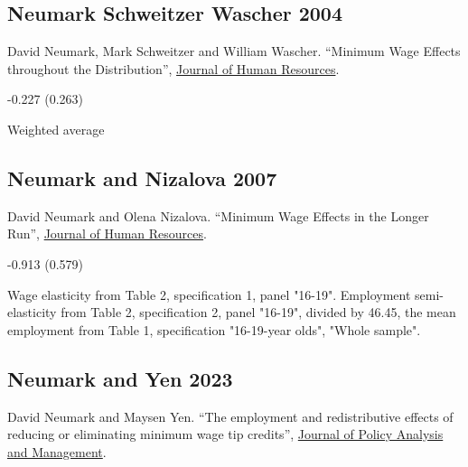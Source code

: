 \subsection*{Neumark Schweitzer Wascher 2004}
\vspace{-0.7em}

\noindent David Neumark, Mark Schweitzer and William Wascher. ``Minimum Wage Effects throughout the Distribution'', \href{https://doi.org/10.3368/jhr.XXXIX.2.425}{Journal of Human Resources}.

\vspace{0.7em}

 -0.227 (0.263)

\vspace{0.7em}

 Weighted average

\subsection*{Neumark and Nizalova 2007}
\vspace{-0.7em}

\noindent David Neumark and Olena Nizalova. ``Minimum Wage Effects in the Longer Run'', \href{https://doi.org/10.3368/jhr.XLII.2.435}{Journal of Human Resources}.

\vspace{0.7em}

 -0.913 (0.579)

\vspace{0.7em}

 Wage elasticity from Table 2, specification 1, panel "16-19". Employment semi-elasticity from Table 2, specification 2, panel "16-19", divided by 46.45, the mean employment from Table 1, specification "16-19-year olds", "Whole sample".

\subsection*{Neumark and Yen 2023}
\vspace{-0.7em}

\noindent David Neumark and Maysen Yen. ``The employment and redistributive effects of reducing or eliminating minimum wage tip credits'', \href{https://doi.org/10.1002/pam.22450}{Journal of Policy Analysis and Management}.

\vspace{0.7em}

